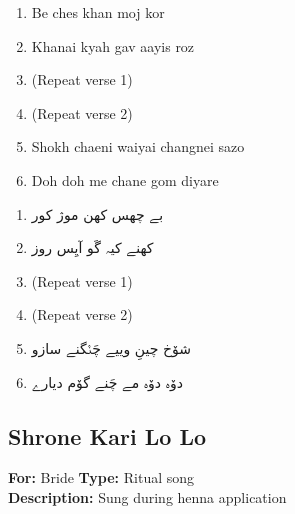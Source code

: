 \documentclass[12pt]{article}
\newcommand{\bigroman}[1]{\fontsize{16pt}{18pt}\selectfont\RaggedRight #1}
\newcommand{\bigarabic}[1]{\fontsize{16pt}{18pt}\selectfont \textarabic{#1}}
\begin{document}
  \begin{multicols}{2}
    \begin{enumerate}[leftmargin=*, label=\arabic*., font=\fontsize{16pt}{18pt}\selectfont]
      \item \bigroman{Be ches khan moj kor}
      \item \bigroman{Khanai kyah gav aayis roz}
      \item \bigroman{(Repeat verse 1)}
      \item \bigroman{(Repeat verse 2)}
      \item \bigroman{Shokh chaeni waiyai changnei sazo}
      \item \bigroman{Doh doh me chane gom diyare}
    \end{enumerate}
    
    \columnbreak
    
    \begin{RTL}
    \begin{enumerate}[leftmargin=*, label=\arabic*., font=\fontsize{16pt}{18pt}\selectfont]
      \item \bigarabic{بے چھس کھن موژ کور}
      \item \bigarabic{کھنے کیہ گَو آیِس روز}
      \item \bigarabic{(Repeat verse 1)}
      \item \bigarabic{(Repeat verse 2)}
      \item \bigarabic{شۆخ چینِ وییے چَنٛگنے سازو}
      \item \bigarabic{دۆہ دۆہ مے چَنے گۆم دیارے}
    \end{enumerate}
    \end{RTL}
    \end{multicols}





    \subsection*{Shrone Kari Lo Lo}
    \textbf{For:} Bride \quad \textbf{Type:} Ritual song\\
    \textbf{Description:} Sung during henna application
    
  
\end{document}
